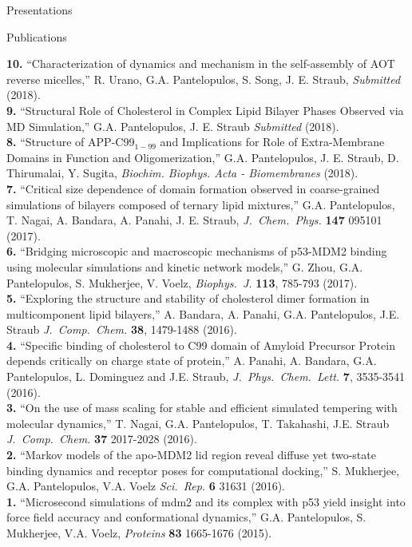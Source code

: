 \documentclass[a4paper]{article}
\def\jcc{\it J.~Comp.~Chem.}
\def\jpcl{\it J.~Phys.~Chem.~Lett.}
\def\prot{\it Proteins}
\def\jcp{\it J.~Chem.~Phys.}
\def\bj{\it Biophys.~J.}
\def\jpcl{\it J.~Phys.~Chem.~Lett.}
\def\scirep{\it Sci.~Rep.}
\begin{document}
\begin{rubrique}{Presentations}
\end{rubrique}

\begin{rubrique}{Publications}
\end{rubrique}

{\bf 10.} ``Characterization of dynamics and mechanism in the self-assembly of AOT reverse micelles,'' R. Urano, G.A. Pantelopulos, S. Song, J. E. Straub, \textit{Submitted} (2018). \\
{\bf 9.} ``Structural Role of Cholesterol in Complex Lipid Bilayer Phases Observed via MD Simulation,'' G.A. Pantelopulos, J. E. Straub \textit{Submitted} (2018). \\
{\bf 8.} ``Structure of APP-C99$_{1-99}$ and Implications for Role of Extra-Membrane Domains in Function and Oligomerization,'' G.A. Pantelopulos, J. E. Straub, D. Thirumalai, Y. Sugita, \textit{Biochim. Biophys. Acta - Biomembranes} (2018). \\
{\bf 7.} ``Critical size dependence of domain formation observed in coarse-grained simulations of bilayers composed of ternary lipid mixtures,'' G.A. Pantelopulos, T. Nagai, A. Bandara, A. Panahi, J. E. Straub, {\jcp} {\bf 147} 095101 (2017). \\
{\bf 6.} ``Bridging microscopic and macroscopic mechanisms of p53-MDM2 binding using molecular simulations and kinetic network models,'' G. Zhou, G.A. Pantelopulos, S. Mukherjee, V. Voelz, {\bj} {\bf 113},  785-793 (2017). \\
{\bf 5.} ``Exploring the structure and stability of cholesterol dimer formation in multicomponent lipid bilayers,'' A. Bandara, A. Panahi, G.A. Pantelopulos, J.E. Straub {\jcc} {\bf 38}, 1479-1488 (2016). \\
{\bf 4.}  ``Specific binding of cholesterol to C99 domain of Amyloid Precursor Protein depends critically on charge state of protein,'' A. Panahi, A. Bandara, G.A. Pantelopulos, L. Dominguez and J.E. Straub, {\jpcl} {\bf 7}, 3535-3541 (2016). \\
{\bf 3.} ``On the use of mass scaling for stable and efficient simulated tempering with molecular dynamics,'' T. Nagai, G.A. Pantelopulos, T. Takahashi, J.E. Straub {\jcc} {\bf 37} 2017-2028 (2016). \\
{\bf 2.} ``Markov models of the apo-MDM2 lid region reveal diffuse yet two-state binding dynamics and receptor poses for computational docking,'' S. Mukherjee, G.A. Pantelopulos, V.A. Voelz {\scirep} {\bf 6} 31631 (2016). \\
{\bf 1.} ``Microsecond simulations of mdm2 and its complex with p53 yield insight into force field accuracy and conformational dynamics,'' G.A. Pantelopulos, S. Mukherjee, V.A. Voelz, {\prot} {\bf 83} 1665-1676 (2015).
\end{document}

